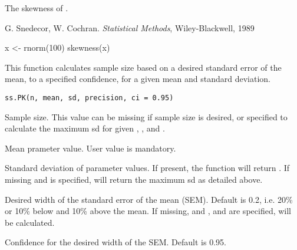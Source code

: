 \documentclass[a4paper]{book}
\begin{document}
%
\begin{Value}
The skewness of .
\end{Value}
%
\begin{References}\relax
G. Snedecor, W. Cochran. \emph{Statistical Methods}, 
Wiley-Blackwell, 1989
\end{References}
%
\begin{Examples}
\begin{ExampleCode}

x <- rnorm(100)
skewness(x)

\end{ExampleCode}
\end{Examples}
%
\begin{Description}\relax
This function calculates sample size based on a desired standard error of the mean,
to a specified confidence, for a given mean and standard deviation.
\end{Description}
%
\begin{Usage}
\begin{verbatim}
ss.PK(n, mean, sd, precision, ci = 0.95)
\end{verbatim}
\end{Usage}
%
\begin{Arguments}
\begin{ldescription}
\item[\code{n}] Sample size.  This value can be missing if sample size is desired, or 
specified to calculate the maximum sd for given , , and .

\item[\code{mean}] Mean prameter value.  User value is mandatory.

\item[\code{sd}] Standard deviation of parameter values.  If present, the function will return .
If missing and  is specified, will return the maximum sd as detailed above.

\item[\code{precision}] Desired width of the standard error of the mean (SEM).  Default is 0.2, i.e. 20\% or
10\% below and 10\% above the mean.  If missing, and ,  and  are specified,
 will be calculated.

\item[\code{ci}] Confidence for the desired width of the SEM.  Default is 0.95.
\end{ldescription}
\end{Arguments}
\end{document}
